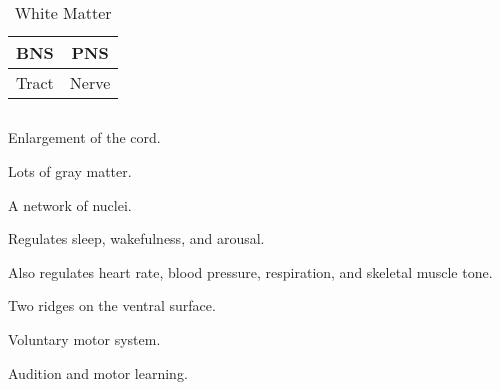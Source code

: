 \begin{table}[htbp]
    \centering
    \begin{tabular}{cc}
        \toprule
        \textbf{BNS} & \textbf{PNS} \\ \midrule
        Tract & Nerve \\
        \bottomrule
    \end{tabular}
    \caption{White Matter}\label{tab:}
\end{table}

\subsection{}

\begin{coloredlist}
    \item {}
    \begin{coloredlist}
        \item {}
        \begin{coloredlist}
            \item Enlargement of the cord.
            \item Lots of gray matter.
            \item {}
            \begin{coloredlist}
                \item A network of nuclei.
                \item Regulates sleep, wakefulness, and arousal.
                \item Also regulates heart rate, blood pressure, respiration, and skeletal muscle tone.
            \end{coloredlist}
            \item {}
            \begin{coloredlist}
                \item Two ridges on the ventral surface.
                \begin{coloredlist}
                    \item Voluntary motor system.
                \end{coloredlist}
            \end{coloredlist}
            \item {}
            \begin{coloredlist}
                \item Audition and motor learning.

\end{coloredlist}
\end{coloredlist}
\end{coloredlist}
\end{coloredlist}
